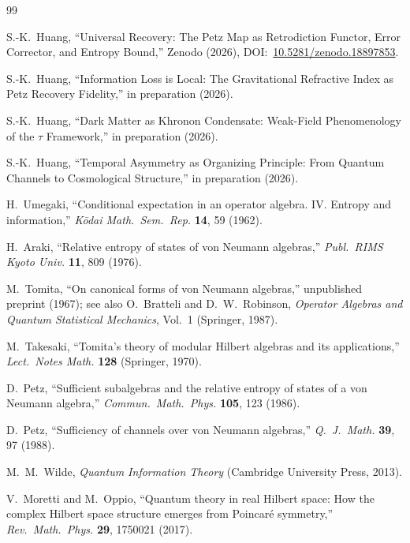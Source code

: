 \documentclass[letterpaper,twocolumn,superscriptaddress,longbibliography]{revtex4-2}
\begin{document}
\begin{thebibliography}{99}


S.-K.~Huang,
``Universal Recovery: The Petz Map as Retrodiction Functor,
Error Corrector, and Entropy Bound,''
Zenodo (2026),
DOI:~\href{https://doi.org/10.5281/zenodo.18897853}{10.5281/zenodo.18897853}.

S.-K.~Huang,
``Information Loss is Local:
The Gravitational Refractive Index as Petz Recovery Fidelity,''
in preparation (2026).

S.-K.~Huang,
``Dark Matter as Khronon Condensate: Weak-Field Phenomenology
of the $\tau$ Framework,''
in preparation (2026).

S.-K.~Huang,
``Temporal Asymmetry as Organizing Principle:
From Quantum Channels to Cosmological Structure,''
in preparation (2026).


H.~Umegaki,
``Conditional expectation in an operator algebra. IV.
Entropy and information,''
\textit{K\={o}dai Math.\ Sem.\ Rep.} \textbf{14}, 59 (1962).

H.~Araki,
``Relative entropy of states of von Neumann algebras,''
\textit{Publ.\ RIMS Kyoto Univ.} \textbf{11}, 809 (1976).

M.~Tomita,
``On canonical forms of von Neumann algebras,''
unpublished preprint (1967);
see also O.~Bratteli and D.~W.~Robinson,
\textit{Operator Algebras and Quantum Statistical Mechanics},
Vol.~1 (Springer, 1987).

M.~Takesaki,
``Tomita's theory of modular Hilbert algebras and its
applications,''
\textit{Lect.\ Notes Math.} \textbf{128} (Springer, 1970).

D.~Petz,
``Sufficient subalgebras and the relative entropy of states
of a von Neumann algebra,''
\textit{Commun.\ Math.\ Phys.} \textbf{105}, 123 (1986).

D.~Petz,
``Sufficiency of channels over von Neumann algebras,''
\textit{Q.\ J.\ Math.} \textbf{39}, 97 (1988).

M.~M.~Wilde,
\textit{Quantum Information Theory}
(Cambridge University Press, 2013).


V.~Moretti and M.~Oppio,
``Quantum theory in real Hilbert space: How the complex
Hilbert space structure emerges from Poincar\'{e} symmetry,''
\textit{Rev.\ Math.\ Phys.} \textbf{29}, 1750021 (2017).


\end{thebibliography}
\end{document}
